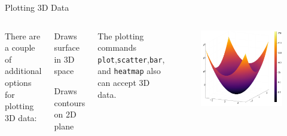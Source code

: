 \documentclass{beamer}
\begin{document}
\begin{frame}[fragile]{Plotting 3D Data}
	\begin{columns}
		There are a couple of additional options for plotting 3D data:
		\begin{description}[align=right]
			\item[surface(x,y,z)] Draws surface in 3D space
			\item[contour(x,y,z)] Draws contours on 2D plane
		\end{description}
		The plotting commands \verb|plot|,\verb|scatter|,\verb|bar|, and \verb|heatmap| also can accept 3D data.
		\begin{figure}
			\centering
			\includegraphics[width=\textwidth]{surf}
		\end{figure}
	\end{columns}
\end{frame}
\end{document}
